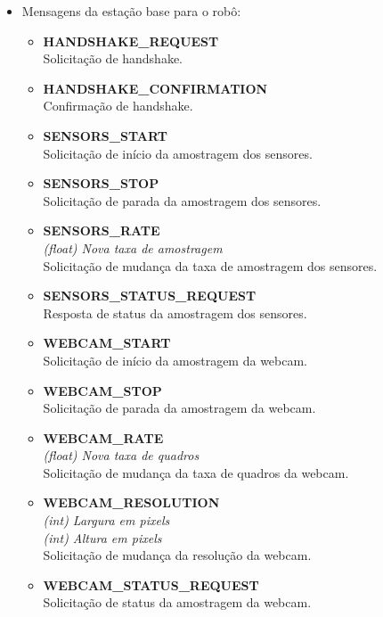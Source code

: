 \begin{itemize}
  \item Mensagens da estação base para o robô:

    \begin{itemize}
      \item \textbf{HANDSHAKE\_REQUEST}\\
	Solicitação de handshake.

      \item \textbf{HANDSHAKE\_CONFIRMATION}\\
	Confirmação de handshake.

      \item \textbf{SENSORS\_START}\\
	Solicitação de início da amostragem dos sensores.

      \item \textbf{SENSORS\_STOP}\\
	Solicitação de parada da amostragem dos sensores.

      \item \textbf{SENSORS\_RATE} \\
	\textit{(float) Nova taxa de amostragem}\\
	Solicitação de mudança da taxa de amostragem dos sensores.

      \item \textbf{SENSORS\_STATUS\_REQUEST}\\
	Resposta de status da amostragem dos sensores.

      \item \textbf{WEBCAM\_START}\\
	Solicitação de início da amostragem da webcam.

      \item \textbf{WEBCAM\_STOP}\\
	Solicitação de parada da amostragem da webcam.

      \item \textbf{WEBCAM\_RATE} \\
	\textit{(float) Nova taxa de quadros}\\
	Solicitação de mudança da taxa de quadros da webcam.

      \item \textbf{WEBCAM\_RESOLUTION} \\
	\textit{(int) Largura em pixels }\\
	\textit{(int) Altura em pixels}\\
	Solicitação de mudança da resolução da webcam.

      \item \textbf{WEBCAM\_STATUS\_REQUEST}\\
	Solicitação de status da amostragem da webcam.


\end{itemize}
\end{itemize}
